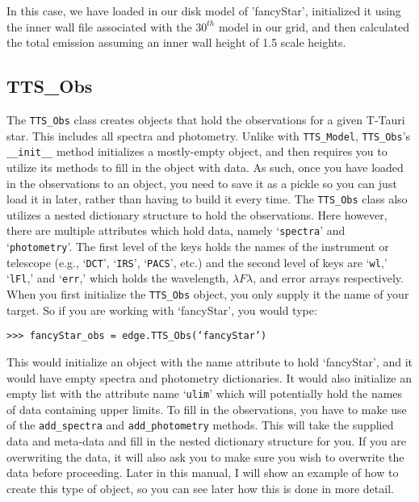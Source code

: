 \documentclass{emulateapj}
\begin{document}
In this case, we have loaded in our disk model of 'fancyStar', initialized it using the inner wall file associated with the $30^{th}$ model in our grid, and then calculated the total emission assuming an inner wall height of 1.5 scale heights. 
 
 
\subsection{TTS\_Obs}
 
The \texttt{TTS\_Obs} class creates objects that hold the observations for a given T-Tauri star. This includes all spectra and photometry. Unlike with \texttt{TTS\_Model}, \texttt{TTS\_Obs}’s \texttt{\_\_init\_\_} method initializes a mostly-empty object, and then requires you to utilize its methods to fill in the object with data. As such, once you have loaded in the observations to an object, you need to save it as a pickle so you can just load it in later, rather than having to build it every time. 
The \texttt{TTS\_Obs} class also utilizes a nested dictionary structure to hold the observations. Here however, there are multiple attributes which hold data, namely `\texttt{spectra}' and `\texttt{photometry}'. The first level of the keys holds the names of the instrument or telescope (e.g., ‘\texttt{DCT}’, ‘\texttt{IRS}’, ‘\texttt{PACS}’, etc.) and the second level of keys are ‘\texttt{wl},’ ‘\texttt{lFl},’ and ‘\texttt{err},’ which holds the wavelength, $\lambda F\lambda$, and error arrays respectively.  
When you first initialize the \texttt{TTS\_Obs} object, you only supply it the name of your target. So if you are working with `fancyStar', you would type: 

\vspace{2mm}
\texttt{>>> fancyStar\_obs = edge.TTS\_Obs(‘fancyStar’)}
\vspace{2mm}

This would initialize an object with the name attribute to hold `fancyStar', and it would have empty spectra and photometry dictionaries. It would also initialize an empty list with the attribute name ‘\texttt{ulim}’ which will potentially hold the names of data containing upper limits. 
To fill in the observations, you have to make use of the \texttt{add\_spectra} and \texttt{add\_photometry} methods. This will take the supplied data and meta-data and fill in the nested dictionary structure for you. If you are overwriting the data, it will also ask you to make sure you wish to overwrite the data before proceeding. Later in this manual, I will show an example of how to create this type of object, so you can see later how this is done in more detail. 
 
\end{document}
